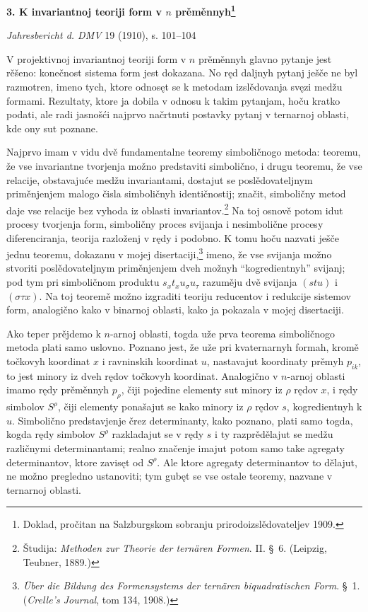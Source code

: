 \documentclass[11pt]{article}
\begin{document}
\begin{center}
{\Large\bfseries 3. K invariantnoj teoriji form v $n$ prěměnnyh\footnote{Doklad, pročitan na Salzburgskom sobranju prirodoizslědovateljev 1909.}}\par
\vspace{1.2em}
\emph{Jahresbericht d. DMV} 19 (1910), s. 101--104
\end{center}

\vspace{1em}
V projektivnoj invariantnoj teoriji form v $n$ prěměnnyh glavno pytanje jest rěšeno: konečnost sistema form jest dokazana. No ręd daljnyh pytanj ješče ne byl razmotren, imeno tych, ktore odnosęt se k metodam izslědovanja svęzi medžu formami. Rezultaty, ktore ja dobila v odnosu k takim pytanjam, hoču kratko podati, ale radi jasnošći najprvo načrtnuti postavky pytanj v ternarnoj oblasti, kde ony sut poznane.

Najprvo imam v vidu dvě fundamentalne teoremy simboličnogo metoda: teoremu, že vse invariantne tvorjenja možno predstaviti simbolično, i drugu teoremu, že vse relacije, obstavajuće medžu invariantami, dostajut se poslědovateljnym priměnjenjem malogo čisla simboličnyh identičnostij; značit, simboličny metod daje vse relacije bez vyhoda iz oblasti invariantov.\footnote{Študija: \emph{Methoden zur Theorie der ternären Formen}. II. \S\ 6. (Leipzig, Teubner, 1889.)} Na toj osnově potom idut procesy tvorjenja form, simboličny proces svijanja i nesimbolične procesy diferenciranja, teorija razloženj v rędy i podobno. K tomu hoču nazvati ješče jednu teoremu, dokazanu v mojej disertaciji,\footnote{\emph{Über die Bildung des Formensystems der ternären biquadratischen Form}. \S\ 1. (\emph{Crelle's Journal}, tom 134, 1908.)} imeno, že vse svijanja možno stvoriti poslědovateljnym priměnjenjem dveh možnyh ``kogredientnyh'' svijanj; pod tym pri simboličnom produktu $s_x t_x u_\sigma u_\tau$ razuměju dvě svijanja $(stu)$ i $(\sigma\tau x)$. Na toj teoremě možno izgraditi teoriju reducentov i redukcije sistemov form, analogično kako v binarnoj oblasti, kako ja pokazala v mojej disertaciji.

Ako teper prějdemo k $n$-arnoj oblasti, togda uže prva teorema simboličnogo metoda plati samo uslovno. Poznano jest, že uže pri kvaternarnyh formah, kromě točkovyh koordinat $x$ i ravninskih koordinat $u$, nastavajut koordinaty prěmyh $p_{ik}$, to jest minory iz dveh rędov točkovyh koordinat. Analogično v $n$-arnoj oblasti imamo rędy prěměnnyh $p_\rho$, čiji pojedine elementy sut minory iz $\rho$ rędov $x$, i rędy simbolov $S^\rho$, čiji elementy ponašajut se kako minory iz $\rho$ rędov $s$, kogredientnyh k $u$. Simbolično predstavjenje črez determinanty, kako poznano, plati samo togda, kogda rędy simbolov $S^\rho$ razkladajut se v rędy $s$ i ty razprědělajut se medžu različnymi determinantami; realno značenje imajut potom samo take agregaty determinantov, ktore zavisęt od $S^\rho$. Ale ktore agregaty determinantov to dělajut, ne možno pregledno ustanoviti; tym gubęt se vse ostale teoremy, nazvane v ternarnoj oblasti.
\end{document}
